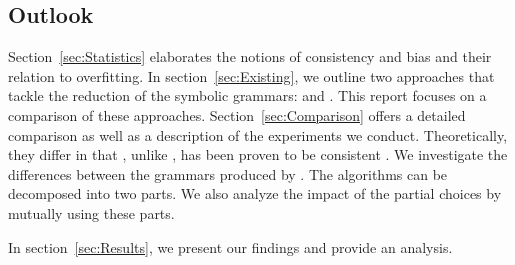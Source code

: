 \subsection{Outlook}
Section~\ref{sec:Statistics} elaborates the notions of consistency and bias and their relation to overfitting.
In section~\ref{sec:Existing}, we outline two approaches that tackle the reduction of the symbolic grammars: \ddop{} and \dops{}. This report focuses on a comparison of these approaches. Section~\ref{sec:Comparison} offers a detailed comparison as well as a description of the experiments we conduct. Theoretically, they differ in that \dops{}, unlike \ddop{}, has been proven to be consistent \cite{zollmann2005}. We investigate the differences between the grammars produced by \ddop{} \dops{}. The algorithms can be decomposed into two parts. We also analyze the impact of the partial choices by mutually using these parts.

In section~\ref{sec:Results}, we present our findings and provide an analysis. 


